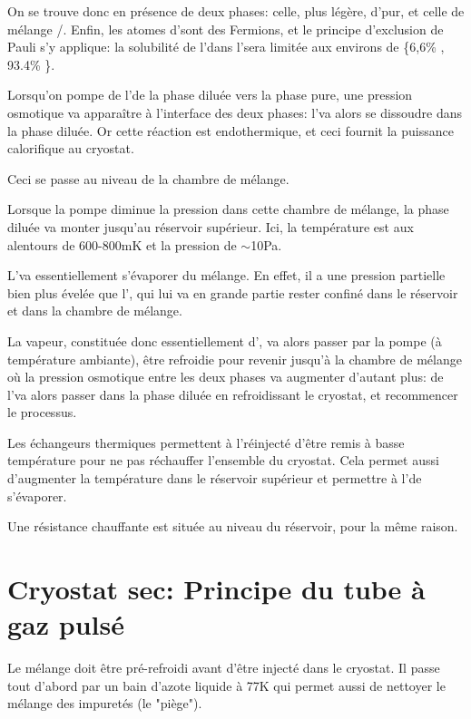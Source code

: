 On se trouve donc en présence de deux phases: celle, plus légère, d'\HeT pur, et celle de mélange \HeT/\HeQ.
Enfin, les atomes d'\HeT sont des Fermions, et le principe d'exclusion de Pauli s'y applique: la solubilité de l'\HeT dans l'\HeQ sera limitée aux environs de \{6,6\% \HeT, 93.4\% \HeQ\}.
\newline

Lorsqu'on pompe de l'\HeT de la phase diluée vers la phase pure, une pression osmotique va apparaître à l'interface des deux phases: l'\HeT va alors se dissoudre dans la phase diluée. Or cette réaction est endothermique, et ceci fournit la puissance calorifique au cryostat.

Ceci se passe au niveau de la chambre de mélange.\newline

Lorsque la pompe diminue la pression dans cette chambre de mélange, la phase diluée va monter jusqu'au réservoir supérieur. Ici, la température est aux alentours de 600-800mK et la pression de $\sim$10Pa.

L'\HeT va essentiellement s'évaporer du mélange. En effet, il a une pression partielle bien plus évelée que l'\HeQ, qui lui va en grande partie rester confiné dans le réservoir et dans la chambre de mélange.
\newline

La vapeur, constituée donc essentiellement d'\HeT, va alors passer par la pompe (à température ambiante), être refroidie pour revenir jusqu'à la chambre de mélange où la pression osmotique entre les deux phases va augmenter d'autant plus: de l'\HeT va alors passer dans la phase diluée en refroidissant le cryostat, et recommencer le processus. \newline

Les échangeurs thermiques permettent à l'\HeT réinjecté d'être remis à basse température pour ne pas réchauffer l'ensemble du cryostat. Cela permet aussi d'augmenter la température dans le réservoir supérieur et permettre à l'\HeT de s'évaporer.

Une résistance chauffante est située au niveau du réservoir, pour la même raison.

\section{Cryostat sec: Principe du tube à gaz pulsé}
Le mélange doit être pré-refroidi avant d'être injecté dans le cryostat.\newline
Il passe tout d'abord par un bain d'azote liquide à 77K qui permet aussi de nettoyer le mélange des impuretés (le "piège").

